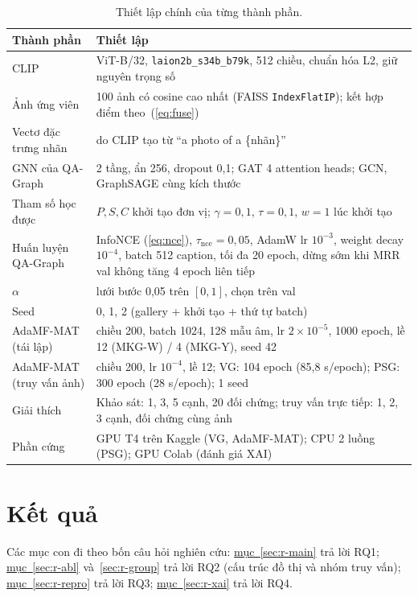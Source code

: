 \documentclass[conference]{IEEEtran}
\begin{document}
\begin{table}[t]
\caption{Thiết lập chính của từng thành phần.}\label{tab:impl}
\centering\footnotesize
\setlength{\tabcolsep}{3pt}
\begin{adjustbox}{max width=\columnwidth}
\begin{tabular}{lL{5.8cm}}
\toprule
Thành phần & Thiết lập\\\midrule
CLIP & ViT-B/32, \texttt{laion2b\_s34b\_b79k}, 512 chiều, chuẩn hóa L2, giữ nguyên trọng số\\
Ảnh ứng viên & 100 ảnh có cosine cao nhất (FAISS \texttt{IndexFlatIP}); kết hợp điểm theo~(\ref{eq:fuse})\\
Vectơ đặc trưng nhãn & do CLIP tạo từ ``a photo of a \{nhãn\}''\\
GNN của QA-Graph & 2 tầng, ẩn 256, dropout 0,1; GAT 4 attention heads; GCN, GraphSAGE cùng kích thước\\
Tham số học được & $P,S,C$ khởi tạo đơn vị; $\gamma=0{,}1$, $\tau=0{,}1$, $w=1$ lúc khởi tạo\\
Huấn luyện QA-Graph & InfoNCE (\ref{eq:nce}), $\tau_{\text{nce}}=0{,}05$, AdamW lr $10^{-3}$, weight decay $10^{-4}$, batch 512 caption, tối đa 20 epoch, dừng sớm khi MRR val không tăng 4 epoch liên tiếp\\
$\alpha$ & lưới bước 0,05 trên $[0,1]$, chọn trên val\\
Seed & 0, 1, 2 (gallery + khởi tạo + thứ tự batch)\\
AdaMF-MAT (tái lập) & chiều 200, batch 1024, 128 mẫu âm, lr $2\!\times\!10^{-5}$, 1000 epoch, lề 12 (MKG-W) / 4 (MKG-Y), seed 42\\
AdaMF-MAT (truy vấn ảnh) & chiều 200, lr $10^{-4}$, lề 12; VG: 104 epoch (85,8 s/epoch); PSG: 300 epoch (28 s/epoch); 1 seed\\
Giải thích & Khảo sát: 1, 3, 5 cạnh, 20 đối chứng; truy vấn trực tiếp: 1, 2, 3 cạnh, đối chứng cùng ảnh\\
Phần cứng & GPU T4 trên Kaggle (VG, AdaMF-MAT); CPU 2 luồng (PSG); GPU Colab (đánh giá XAI)\\\bottomrule
\end{tabular}
\end{adjustbox}
\end{table}

\section{Kết quả}\label{sec:results}
Các mục con đi theo bốn câu hỏi nghiên cứu: \hyperref[sec:r-main]{mục~\ref*{sec:r-main}} trả lời RQ1; \hyperref[sec:r-abl]{mục~\ref*{sec:r-abl}} và~\ref{sec:r-group} trả lời RQ2 (cấu trúc đồ thị và nhóm truy vấn); \hyperref[sec:r-repro]{mục~\ref*{sec:r-repro}} trả lời RQ3; \hyperref[sec:r-xai]{mục~\ref*{sec:r-xai}} trả lời RQ4.
\end{document}
